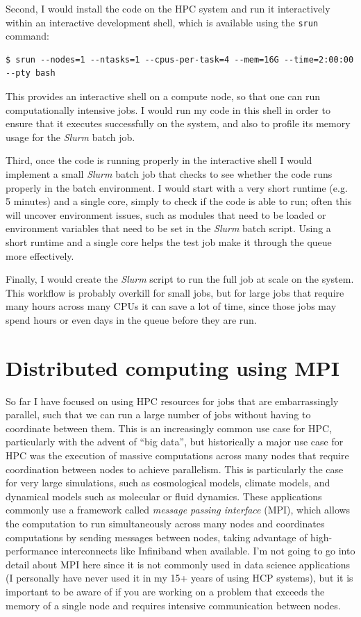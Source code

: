Second, I would install the code on the HPC system and run it interactively within an interactive development shell, which is available using the \texttt{srun} command:

\begin{lstlisting}[style=shellshort]
$ srun --nodes=1 --ntasks=1 --cpus-per-task=4 --mem=16G --time=2:00:00 --pty bash
\end{lstlisting}

This provides an interactive shell on a compute node, so that one can run computationally intensive jobs.  I would run my code in this shell in order to ensure that it executes successfully on the system, and also to profile its memory usage for the \textit{Slurm} batch job.

Third, once the code is running properly in the interactive shell I would implement a small \textit{Slurm} batch job that checks to see whether the code runs properly in the batch environment.  I would start with a very short runtime (e.g. 5 minutes) and a single core, simply to check if the code is able to run; often this will uncover environment issues, such as modules that need to be loaded or environment variables that need to be set in the \textit{Slurm} batch script.  Using a short runtime and a single core helps the test job make it through the queue more effectively.

Finally, I would create the \textit{Slurm} script to run the full job at scale on the system.  This workflow is probably overkill for small jobs, but for large jobs that require many hours across many CPUs it can save a lot of time, since those jobs may spend hours or even days in the queue before they are run.

\section{Distributed computing using MPI}

So far I have focused on using HPC resources for jobs that are embarrassingly parallel, such that we can run a large number of jobs without having to coordinate between them.  This is an increasingly common use case for HPC, particularly with the advent of ``big data'', but historically a major use case for HPC was the execution of massive computations across many nodes that require coordination between nodes to achieve parallelism.  This is particularly the case for very large simulations, such as cosmological models, climate models, and dynamical models such as molecular or fluid dynamics.  These applications commonly use a framework called \textit{message passing interface} (MPI), which allows the computation to run simultaneously across many nodes and coordinates computations by sending messages between nodes, taking advantage of high-performance interconnects like Infiniband when available.  I'm not going to go into detail about MPI here since it is not commonly used in data science applications (I personally have never used it in my 15+ years of using HCP systems), but it is important to be aware of if you are working on a problem that exceeds the memory of a single node and requires intensive communication between nodes.


